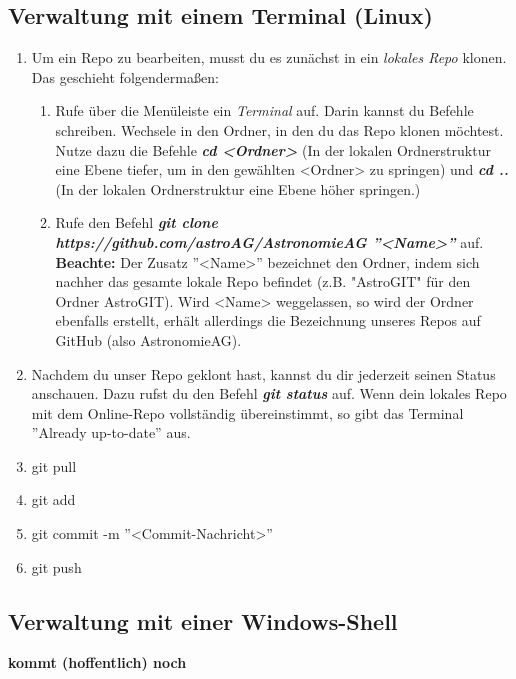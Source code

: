 \documentclass[12pt,a4paper,notitlepage,onecolumn,portrait,oneside, , , ]{scrartcl}
\begin{document}
\subsection{Verwaltung mit einem Terminal (Linux)}
\begin{enumerate}[label=\arabic*.]
\item Um ein Repo zu bearbeiten, musst du es zunächst in ein \textit{lokales Repo} klonen. Das geschieht folgendermaßen:
\begin{enumerate}[label=(\alph*)]
\item Rufe über die Menüleiste ein \textit{Terminal} auf. Darin kannst du Befehle schreiben. Wechsele in den Ordner, in den du das Repo klonen möchtest. Nutze dazu die Befehle \textbf{\textit{cd <Ordner>}} (In der lokalen Ordnerstruktur eine Ebene tiefer, um in den gewählten <Ordner> zu springen) und \textbf{\textit{cd ..}} (In der lokalen Ordnerstruktur eine Ebene höher springen.)
\item Rufe den Befehl \textbf{\textit{git clone https://github.com/astroAG/AstronomieAG ''<Name>''}} auf. \textbf{Beachte:} Der Zusatz ''<Name>'' bezeichnet den Ordner, indem sich nachher das gesamte lokale Repo befindet (z.B. "AstroGIT" für den Ordner AstroGIT). Wird <Name> weggelassen, so wird der Ordner ebenfalls erstellt, erhält allerdings die Bezeichnung unseres Repos auf GitHub (also AstronomieAG).
\end{enumerate}
\item Nachdem du unser Repo geklont hast, kannst du dir jederzeit seinen Status anschauen. Dazu rufst du den Befehl \textbf{\textit{git status}} auf. Wenn dein lokales Repo mit dem Online-Repo vollständig übereinstimmt, so  gibt das Terminal ''Already up-to-date'' aus.
\item git pull
\item git add
\item git commit -m ''<Commit-Nachricht>''
\item git push
\end{enumerate}

\subsection{Verwaltung mit einer Windows-Shell}
\textbf{kommt (hoffentlich) noch}



\end{document}
